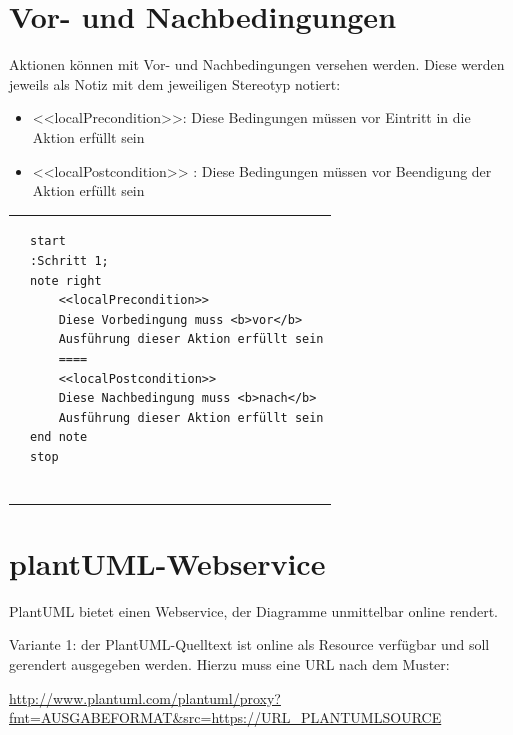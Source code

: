 \documentclass[10pt]{scrartcl}
\begin{document}
\section{Vor- und Nachbedingungen}
Aktionen können mit Vor- und Nachbedingungen versehen werden. Diese werden jeweils als Notiz mit dem jeweiligen Stereotyp notiert:
\begin{itemize}
	\item <<localPrecondition>>: Diese Bedingungen müssen vor Eintritt in die Aktion erfüllt sein
\item <<localPostcondition>> : Diese Bedingungen müssen vor Beendigung der Aktion erfüllt sein
\end{itemize}

\begin{tabular}[b]{p{7cm} p{10cm}}
	
	&
	
	\begin{lstlisting}[style=plantuml]
start
:Schritt 1; 
note right 
	<<localPrecondition>>
	Diese Vorbedingung muss <b>vor</b> 
	Ausführung dieser Aktion erfüllt sein
	====
	<<localPostcondition>>
	Diese Nachbedingung muss <b>nach</b>
	Ausführung dieser Aktion erfüllt sein
end note
stop
	
	\end{lstlisting}
\end{tabular}
\section{plantUML-Webservice}
PlantUML bietet einen Webservice, der Diagramme unmittelbar online rendert.

Variante 1: der PlantUML-Quelltext ist online als Resource verfügbar und soll gerendert ausgegeben werden. Hierzu muss eine URL nach dem Muster:

\href{http://www.plantuml.com/plantuml/proxy?fmt=epstxt&src=https://raw.githubusercontent.com/hannsens/plantUML-UseCase-InfoSheet/master/plantuml/01_Bestandteile_UseCase.plantuml}{http://www.plantuml.com/plantuml/proxy?fmt=AUSGABEFORMAT\&src=https://URL\_PLANTUMLSOURCE}
\end{document}

